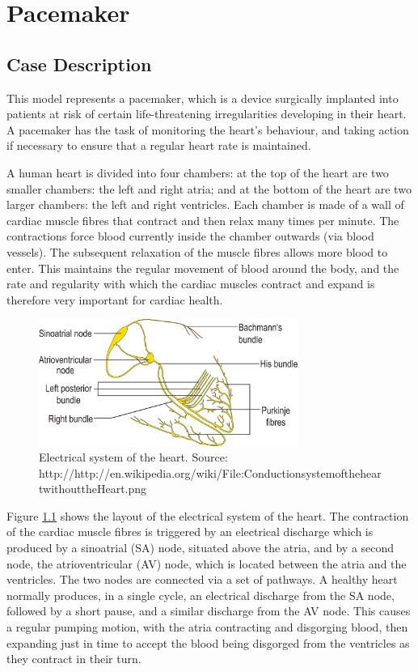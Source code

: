 \chapter{Pacemaker} \label{chap:pacemaker}
\section{Case Description}
This model represents a pacemaker, which is a device surgically
implanted into patients at risk of certain life-threatening
irregularities developing in their heart.  A pacemaker has the task of
monitoring the heart's behaviour, and taking action if necessary to
ensure that a regular heart rate is maintained.

A human heart is divided into four chambers: at the top of the heart
are two smaller chambers: the left and right atria; and at the bottom
of the heart are two larger chambers: the left and right ventricles.
Each chamber is made of a wall of cardiac muscle fibres that contract
and then relax many times per minute.  The contractions force blood
currently inside the chamber outwards (via blood vessels).  The
subsequent relaxation of the muscle fibres allows more blood to
enter.  This maintains the regular movement of blood around the body,
and the rate and regularity with which the cardiac muscles contract
and expand is therefore very important for cardiac health.
\begin{figure}[!ht]
\centering
\includegraphics[width=8.5cm]{pacemaker/ConductionsystemoftheheartwithouttheHeart.png}
\caption{Electrical system of the heart.  Source:\\
  http://http://en.wikipedia.org/wiki/File:ConductionsystemoftheheartwithouttheHeart.png \label{fig:heart}}
\end{figure}

Figure \ref{fig:heart} shows the layout of the electrical system of
the heart.  The contraction of the cardiac muscle fibres is triggered
by an electrical discharge which is produced by a sinoatrial (SA)
node, situated above the atria, and by a second node, the
atrioventricular (AV) node, which is located between the atria and the
ventricles.  The two nodes are connected via a set of pathways.  A
healthy heart normally produces, in a single cycle, an electrical
discharge from the SA node, followed by a short pause, and a similar
discharge from the AV node.  This causes a regular pumping motion,
with the atria contracting and disgorging blood, then expanding just
in time to accept the blood being disgorged from the ventricles as
they contract in their turn.


